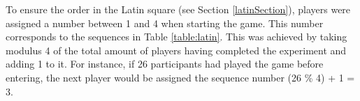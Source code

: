 To ensure the order in the Latin square (see Section \ref{latinSection}), players were assigned a number between 1 and 4 when starting the game. This number corresponds to the sequences in Table \ref{table:latin}. This was achieved by taking modulus 4 of the total amount of players having completed the experiment and adding 1 to it. For instance, if 26 participants had played the game before entering, the next player would be assigned the sequence number (26 \% 4) + 1 = 3.